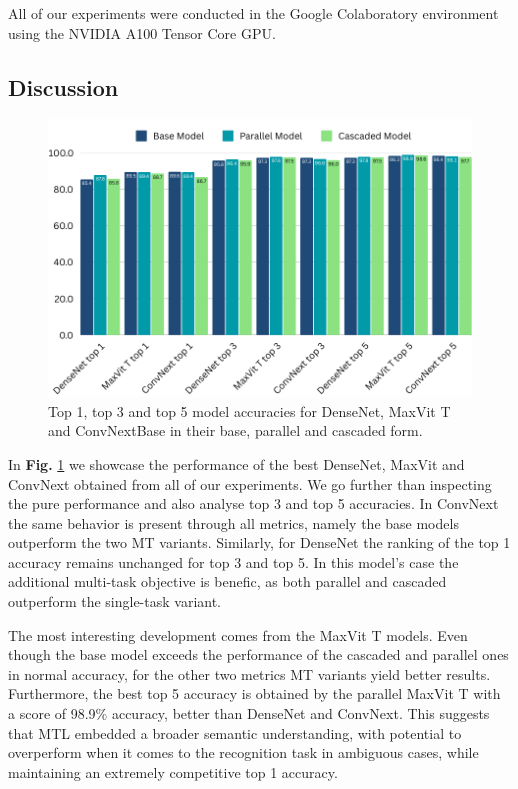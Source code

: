 \documentclass[conference]{IEEEtran}
\begin{document}
All of our experiments were conducted in the Google Colaboratory environment using the NVIDIA A100 Tensor Core GPU.  

\subsection{Discussion}


\begin{figure}[hbt!]
\centering
\centerline{\includegraphics[scale=0.75]{figures/model_topn_accuracies.png}}
	\caption{Top 1, top 3 and top 5 model accuracies for DenseNet, MaxVit T and ConvNextBase in their base, parallel and cascaded form.   }
	\label{fig:topnaccuracies}
\end{figure}


In \textbf{Fig.} \ref{fig:topnaccuracies} we showcase the performance of the best DenseNet, MaxVit and ConvNext obtained from all of our experiments. We go further than inspecting the pure performance and also analyse top 3 and top 5 accuracies. In ConvNext the same behavior is present through all metrics, namely the base models outperform the two MT variants. Similarly, for DenseNet the ranking of the top 1 accuracy remains unchanged for top 3 and top 5. In this model's case the additional multi-task objective is benefic, as both parallel and cascaded outperform the single-task variant. 

The most interesting development comes from the MaxVit T models. Even though the base model exceeds the performance of the cascaded and parallel ones in normal accuracy, for the other two metrics MT variants yield better results. Furthermore, the best top 5 accuracy is obtained by the parallel MaxVit T with a score of 98.9\% accuracy, better than DenseNet and ConvNext. This suggests that MTL embedded a broader semantic understanding, with potential to overperform when it comes to the recognition task in ambiguous cases, while maintaining an extremely competitive top 1 accuracy.
\end{document}
